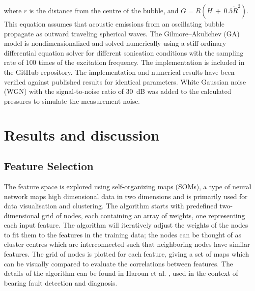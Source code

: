 \documentclass[preprint, linenumbers]{revtex4-2}
\begin{document}
\noindent where $r$ is the distance from the centre of the bubble, and $G=R(H ~+~ 0.5\dot{R}^2)$. This equation assumes that acoustic emissions from an oscillating bubble propagate as outward traveling spherical waves. The Gilmore--Akulichev (GA) model is nondimensionalized and solved numerically using a stiff ordinary differential equation solver for different sonication conditions with the sampling rate of $100$ times of the excitation frequency. The implementation is included in the GitHub repository. \cite{wpt-cavitation2024} The implementation and numerical results have been verified against published results for identical parameters. White Gaussian noise (WGN) with the signal-to-noise ratio of \SI{30}{\dB} was added to the calculated pressures to simulate the measurement noise. 

\section{Results and discussion}

\subsection{Feature Selection}
\label{sec:feature_selection}
The feature space is explored using self-organizing maps (SOMs), \cite{kohonen2012} a type of neural network maps high dimensional data in two dimensions and is primarily used for data visualisation and clustering. The algorithm starts with predefined two-dimensional grid of nodes, each containing an array of weights, one representing each input feature. The algorithm will iteratively adjust the weights of the nodes to fit them to the features in the training data; the nodes can be thought of as cluster centres which are interconnected such that neighboring nodes have similar features. The grid of nodes is plotted for each feature, giving a set of maps which can be visually compared to evaluate the correlations between features. The details of the algorithm can be found in Haroun et al. \cite{haroun2017feature}, used in the context of bearing fault detection and diagnosis. 
\end{document}
